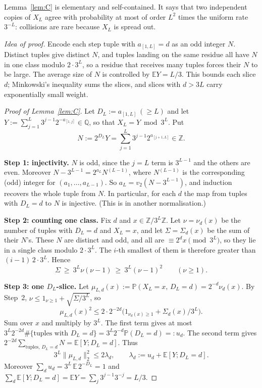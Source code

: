 \documentclass[11pt]{amsart}
\theoremstyle{remark}
\newcommand{\E}{\mathbb{E}}
\renewcommand{\P}{\mathbb{P}}
\newcommand{\Z}{\mathbb{Z}}
\newcommand{\T}[1]{\cite[#1]{Tao22}}   %
\theoremstyle{plain}
\begin{document}
Lemma~\ref{lem:C} is elementary and self-contained. It says that two independent copies of $X_L$ agree with probability at most of order $L^2$ times the uniform rate $3^{-L}$: collisions are rare because $X_L$ is spread out.

\emph{Idea of proof.} Encode each step tuple with $a_{[1,L]}=d$ as an odd integer $N$. Distinct tuples give distinct $N$, and tuples landing on the same residue all have $N$ in one class modulo $2\cdot3^L$, so a residue that receives many tuples forces their $N$ to be large. The average size of $N$ is controlled by $\E Y=L/3$. This bounds each slice $d$; Minkowski's inequality sums the slices, and slices with $d>3L$ carry exponentially small weight.

\begin{proof}[Proof of Lemma~\ref{lem:C}]
Let $D_L:=a_{[1,L]}\ (\ge L)$ and let $Y:=\sum_{j=1}^L3^{j-1}2^{-a_{[1,j]}}\in\mathbb Q$, so that $X_L=Y\bmod3^L$. Put
\[
N:=2^{D_L}Y=\sum_{j=1}^L3^{j-1}2^{a_{[j+1,L]}}\in\Z .
\]

\textbf{Step 1: injectivity.} $N$ is odd, since the $j=L$ term is $3^{L-1}$ and the others are even. Moreover $N-3^{L-1}=2^{a_L}N^{(L-1)}$, where $N^{(L-1)}$ is the corresponding (odd) integer for $(a_1,\dots,a_{L-1})$. So $a_L=v_2(N-3^{L-1})$, and induction recovers the whole tuple from $N$. In particular, for each $d$ the map from tuples with $D_L=d$ to $N$ is injective. (This is \T{Lemma 6.2} in another normalisation.)

\textbf{Step 2: counting one class.} Fix $d$ and $x\in\Z/3^L\Z$. Let $\nu=\nu_d(x)$ be the number of tuples with $D_L=d$ and $X_L=x$, and let $\Sigma=\Sigma_d(x)$ be the sum of their $N$'s. These $N$ are distinct and odd, and all are $\equiv2^dx\pmod{3^L}$, so they lie in a single class modulo $2\cdot3^L$. The $i$-th smallest of them is therefore greater than $(i-1)\,2\cdot3^L$. Hence
\[
\Sigma\ \ge\ 3^L\nu(\nu-1)\ \ge\ 3^L(\nu-1)^2\qquad(\nu\ge1).
\]

\textbf{Step 3: one $D_L$-slice.} Let $\mu_{L,d}(x):=\P(X_L=x,\,D_L=d)=2^{-d}\nu_d(x)$. By Step~2, $\nu\le1_{\nu\ge1}+\sqrt{\Sigma/3^L}$, so
\[
\mu_{L,d}(x)^2\le2\cdot2^{-2d}\big(1_{\nu_d(x)\ge1}+\Sigma_d(x)/3^L\big).
\]
Sum over $x$ and multiply by $3^L$. The first term gives at most $3^L2^{-2d}\#\{\text{tuples with }D_L=d\}=3^L2^{-d}\P(D_L=d)=:u_d$. The second term gives $2^{-2d}\sum_{\text{tuples},\,D_L=d}N=\E[Y;D_L=d]$. Thus
\[
3^L\|\mu_{L,d}\|_2^2\le2\lambda_d,\qquad\lambda_d:=u_d+\E[Y;D_L=d].
\]
Moreover $\sum_du_d=3^L\,\E\,2^{-D_L}=1$ and $\sum_d\E[Y;D_L=d]=\E Y=\sum_j3^{j-1}3^{-j}=L/3$.


\end{proof}
\end{document}
